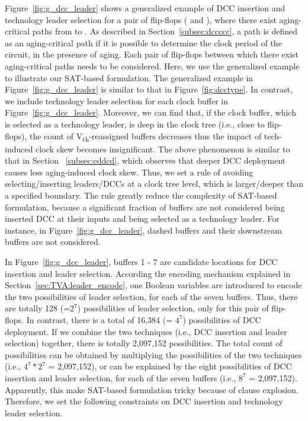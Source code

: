 Figure~\ref{fig:g_dcc_leader} shows a generalized example of DCC insertion and technology leader selection for a pair of flip-flops ( and ), where there exist aging-critical paths from  to . As described in Section~\ref{subsec:dccccc}, a path is defined as an aging-critical path if it is possible to determine the clock period of the circuit, in the presence of aging. Each pair of flip-flops between which there exist aging-critical paths needs to be considered. Here, we use the generalized example to illustrate our SAT-based formulation. The generalized example in Figure~\ref{fig:g_dcc_leader} is similar to that in Figure~\ref{fig:dcctype}. In contrast, we include technology leader selection for each clock buffer in Figure~\ref{fig:g_dcc_leader}. Moreover, we can find that, if the clock buffer, which is selected as a technology leader, is deep in the clock tree (i.e., close to flip-flops), the count of V\textsubscript{th}-reassigned buffers decreases thus the impact of tech-induced clock skew becomes insignificant. The above phenomenon is similar to that in Section ~\ref{subsec:eddcd}, which observes that deeper DCC deployment causes less aging-induced clock skew. Thus, we set a rule of avoiding selecting/inserting leaders/DCCs at a clock tree level, which is larger/deeper than a specified boundary.  The rule greatly reduce the complexity of SAT-based formulation, because a significant fraction of buffers are not considered being inserted DCC at their inputs and being selected as a technology leader. For instance, in Figure~\ref{fig:g_dcc_leader}, dashed buffers and their downstream buffers are not considered. 

In Figure~\ref{fig:g_dcc_leader}, buffers 1 - 7 are candidate locations for DCC insertion and leader selection. According the encoding mechanism explained in Section~\ref{sec:TVA:leader_encode}, one Boolean variables are introduced to encode the two possibilities of leader selection, for each of the seven buffers. Thus, there are totally 128 (=$2^7$) possibilities of leader selection, only for this pair of flip-flops. In contrast, there is a total of 16,384 (= $4^7$) possibilities of DCC  deployment. If we combine the two techniques (i.e., DCC insertion and leader selection) together, there is totally 2,097,152 possibilities. The total count of possibilities can be obtained by multiplying the possibilities of the two techniques (i.e., $4^7*2^7$ = 2,097,152), or can be explained by the eight possibilities of DCC insertion and leader selection, for each of the seven buffers (i.e., $8^7$ = 2,097,152). Apparently, this make SAT-based formulation tricky because of clause explosion. Therefore, we set the following constraints on DCC insertion and technology leader selection.

